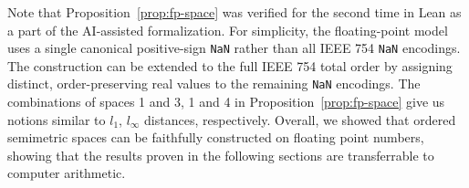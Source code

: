Note that Proposition~\ref{prop:fp-space} was verified for the second time in Lean as a part of the AI-assisted formalization. For simplicity, the floating-point model uses a single canonical positive-sign \texttt{NaN} rather than all IEEE 754 \texttt{NaN} encodings. The construction can be extended to the full IEEE 754 total order by assigning distinct, order-preserving real values to the remaining \texttt{NaN} encodings. The combinations of spaces 1 and 3, 1 and 4 in Proposition~\ref{prop:fp-space} give us notions similar to $l_1$, $l_\infty$ distances, respectively. Overall, we showed that ordered semimetric spaces can be faithfully constructed on floating point numbers, showing that the results proven in the following sections are transferrable to computer arithmetic.